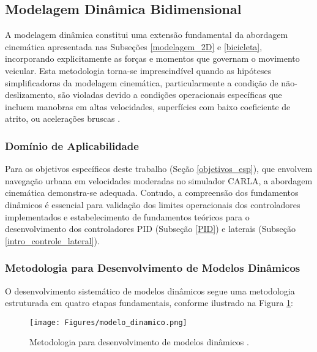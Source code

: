 \subsection{Modelagem Dinâmica Bidimensional} \label{dinamica_2D}

A modelagem dinâmica constitui uma extensão fundamental da abordagem cinemática apresentada nas Subseções \ref{modelagem_2D} e \ref{bicicleta}, incorporando explicitamente as forças e momentos que governam o movimento veicular. Esta metodologia torna-se imprescindível quando as hipóteses simplificadoras da modelagem cinemática, particularmente a condição de não-deslizamento, são violadas devido a condições operacionais específicas que incluem manobras em altas velocidades, superfícies com baixo coeficiente de atrito, ou acelerações bruscas \cite[p.~89]{jacobson2020vehicle}.

\subsubsection{Domínio de Aplicabilidade}

Para os objetivos específicos deste trabalho (Seção \ref{objetivos_esp}), que envolvem navegação urbana em velocidades moderadas no simulador CARLA, a abordagem cinemática demonstra-se adequada. Contudo, a compreensão dos fundamentos dinâmicos é essencial para validação dos limites operacionais dos controladores implementados e estabelecimento de fundamentos teóricos para o desenvolvimento dos controladores PID (Subseção \ref{PID}) e laterais (Subseção \ref{intro_controle_lateral}).

\subsubsection{Metodologia para Desenvolvimento de Modelos Dinâmicos}

O desenvolvimento sistemático de modelos dinâmicos segue uma metodologia estruturada em quatro etapas fundamentais, conforme ilustrado na Figura \ref{modelo_dinamico}:

\begin{figure}[H]
\centering
\texttt{[image: Figures/modelo\_dinamico.png]}
\caption{Metodologia para desenvolvimento de modelos dinâmicos \cite{University_of_Toronto2018-fe}.}
\label{modelo_dinamico}
\end{figure}

